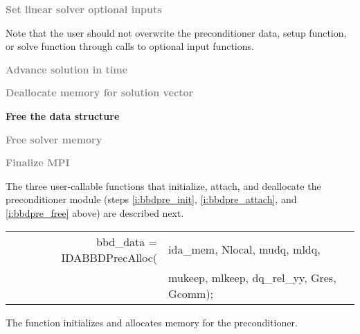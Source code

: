 \begin{Steps}
\item
  \textcolor{gray}{\bf Set linear solver optional inputs}

  Note that the user should not overwrite the preconditioner data, setup function, 
  or solve function through calls to {\idaspgmr} optional input functions.

\item
  \textcolor{gray}{\bf Advance solution in time}

\item
  \textcolor{gray}{\bf Deallocate memory for solution vector}

\item \label{i:bbdpre_free}
  {\bf Free the {\idabbdpre} data structure}


\item
  \textcolor{gray}{\bf Free solver memory}
  
\item 
  \textcolor{gray}{\bf Finalize MPI}

\end{Steps}
The three user-callable functions that initialize, attach, and deallocate
the {\idabbdpre} preconditioner module (steps \ref{i:bbdpre_init},
\ref{i:bbdpre_attach}, and \ref{i:bbdpre_free} above) are described
next.
{
   \begin{tabular}[t]{@{}r@{}l@{}}
     bbd\_data = IDABBDPrecAlloc(&ida\_mem, Nlocal, mudq, mldq, \\
                                 &mukeep, mlkeep, dq\_rel\_yy, Gres, Gcomm);
   \end{tabular}
}
{
  The function  initializes and allocates
  memory for the {\idabbdpre} preconditioner.
}
